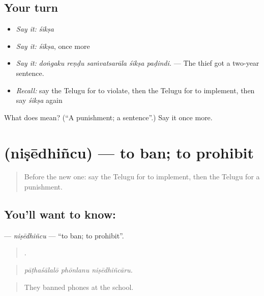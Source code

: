 \subsection*{Your turn}
\begin{itemize}
\raggedright
  \item \emph{Say it:} \emph{śikṣa}
  \item \emph{Say it:} \emph{śikṣa}, once more
  \item \emph{Say it:} \emph{doṅgaku reṇḍu saṁvatsarāla śikṣa paḍindi.} — The thief got a two-year sentence.
  \item \emph{Recall:} say the Telugu for to violate, then the Telugu for to implement, then say \emph{śikṣa} again
\end{itemize}

\begin{tcolorbox}[breakable,colback=teal!4,colframe=teal!35!black,title={Before you move on}]
What does  mean? (\textquotedblleft{}A punishment; a sentence\textquotedblright{}.) Say it once more.
\end{tcolorbox}
\section[\texorpdfstring{\te{నిషేధించు} (niṣēdhiñcu)}{నిషేధించు (niṣēdhiñcu)}]{ (niṣēdhiñcu) — to ban; to prohibit}

\label{lesson:TE-C398-nisedhincu}



\begin{quote}
Before the new one: say the Telugu for to implement, then the Telugu for a punishment.
\end{quote}

\subsection*{You'll want to know: }
\textbf{} — \emph{niṣēdhiñcu} — \textquotedblleft{}to ban; to prohibit\textquotedblright{}.

\begin{quote}
  .
\end{quote}

\begin{quote}
\emph{pāṭhaśālalō phōnlanu niṣēdhiñcāru.}
\end{quote}

\begin{quote}
They banned phones at the school.
\end{quote}

